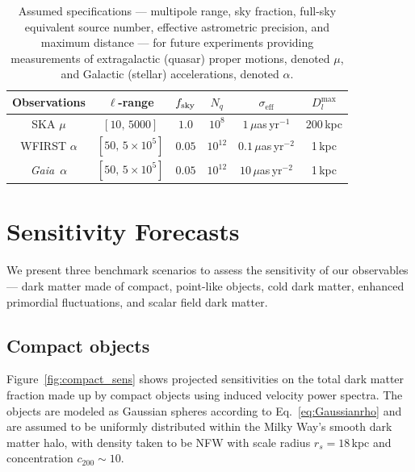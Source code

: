\documentclass[twocolumn]{aastex63}
\newcommand{\Gaia}{\emph{Gaia}}
\begin{document}
\begin{table}[h]
\begin{center}
\begin{tabular}{c|ccccc}
\hline \hline
Observations & $\ell$-range & $f_{\rm sky}$ & $N_q$ & $\sigma_\mathrm{eff}$ & $D_l^\mathrm{max}$ \\ 
\hline \hline
SKA $\mu$ & $[10,\,5000]$ & $1.0$ & $10^8$ & $1\,\mu$as\,yr$^{-1}$ & 200\,kpc\\
\hline
WFIRST $\alpha$ & $[50,\,5\times10^5]$ &  $0.05$ &  $10^{12}$  & $0.1\,\mu$as\,yr$^{-2}$ & 1\,kpc   \\
\Gaia~$\alpha$ & $[50,\,5\times10^5]$ &  $0.05$ &  $10^{12}$  & $10\,\mu$as\,yr$^{-2}$ & 1\,kpc   \\
\hline
\end{tabular}
\end{center}
\caption{Assumed specifications --- multipole range, sky fraction, full-sky equivalent source number, effective astrometric precision, and maximum distance --- for future experiments providing measurements of extragalactic (quasar) proper motions, denoted $\mu$, and Galactic (stellar) accelerations, denoted $\alpha$.}
\label{tab:noise_specs}
\end{table}



\section{Sensitivity Forecasts}
\label{sec:forecasts}

We present three benchmark scenarios to assess the sensitivity of our observables --- dark matter made of compact, point-like objects, cold dark matter, enhanced primordial fluctuations, and scalar field dark matter.

\subsection{Compact objects}
\label{sec:compact}

Figure~\ref{fig:compact_sens} shows projected sensitivities on the total dark matter fraction made up by compact objects using induced velocity power spectra. The objects are modeled as Gaussian spheres according to Eq.~\ref{eq:Gaussianrho} and are assumed to be uniformly distributed within the Milky Way's smooth dark matter halo, with density taken to be NFW with scale radius $r_s = 18$\,kpc and concentration $c_{200}\sim10$. 
\end{document}
